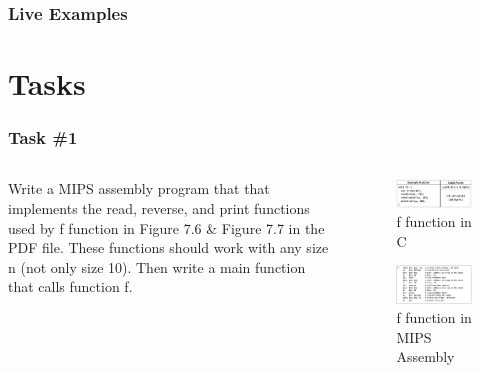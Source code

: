 \documentclass[
	10pt, %
	hmargin=1cm,vmargin=0cm,head=0.5cm,headsep=0pt,foot=0.5cm,margin=2cm
]{beamer}
\begin{document}
\begin{frame}
	\frametitle{Live Examples}
	
\end{frame}


\section{Tasks}

\begin{frame}
	\frametitle{Task \#1}
	\begin{columns}[c]
		\begin{column}{0.5\textwidth}
			\justifying
			Write a MIPS assembly program that that implements the read, reverse, and print functions used by f function in Figure 7.6 \& Figure 7.7 in the PDF file. These functions should work with any size n (not only size 10). Then write a main function that calls function f.
			\vspace{0.15cm}
		\end{column}
		\begin{column}{0.5\textwidth}
			\begin{figure}
				\includegraphics[width=\linewidth]{f_code.png}
				\caption{f function in C}
			\end{figure}
			\vspace{-0.40cm}
			\begin{figure}
				\includegraphics[width=\linewidth]{f_function.png}
				\caption{f function in MIPS Assembly}
			\end{figure}
		\end{column}
	\end{columns}
\end{frame}
\end{document}
